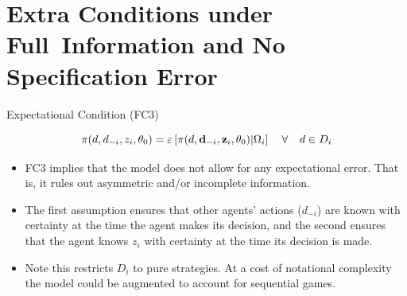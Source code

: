 \documentclass[xcolor=pdftex,dvipsnames,table,mathserif]{beamer}
\begin{document}
\section{Extra Conditions under Full\ Information and No Specification Error}
\begin{frame}{Expectational Condition (FC3)}

\begin{equation*}
\pi (d,d_{-i},z_{i},\theta _{0})=\varepsilon \left[ \pi (d,\mathbf{d}%
_{-i},\mathbf{z}_{i},\theta _{0})| \Omega_i \right] \text{ \hspace{0.1in}} \forall  \text{ \hspace{0.1in}} d\in D_{i}
\end{equation*}
\begin{itemize}
\item FC3 implies that the model does not allow for any expectational error. That
is, it rules out asymmetric and/or incomplete information.
\item The first assumption ensures that other agents' actions ($d_{-i}$) are known with certainty at the time
the agent makes its decision, and the second ensures that the agent knows $z_{i}$ with certainty at the time its decision is made. 
\item  Note this restricts $D_i$ to pure strategies.  At a cost of notational complexity the model could be augmented to account for sequential games.
\end{itemize}
\end{frame}
\end{document}
